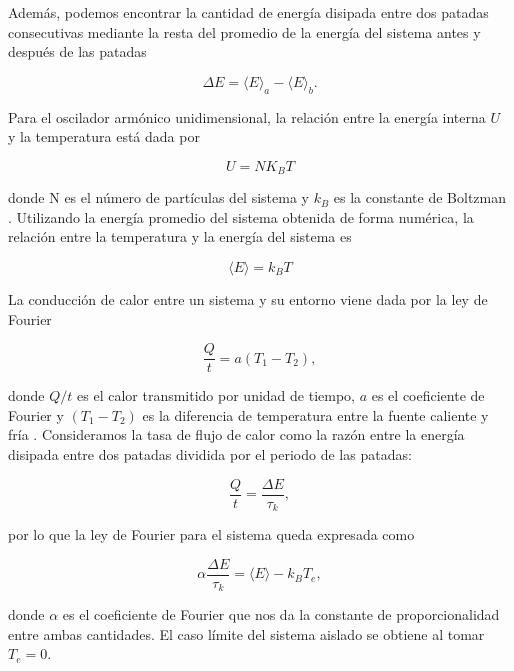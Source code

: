 \documentclass[letterpaper,12pt,oneside]{book}
\begin{document}
	Además, podemos encontrar la cantidad de energía disipada entre dos patadas consecutivas mediante la resta del promedio de la energía del sistema antes y después de las patadas
	
	\begin{equation}\label{Eq.DeltaE}
	\Delta E = \langle E \rangle_a - \langle E \rangle_b.
	\end{equation}
	
	Para el oscilador armónico unidimensional, la relación entre la energía interna $U$ y la temperatura está dada por
	
	\begin{equation} \label{Eq.EnergiaInterna}
	U = N K_B T
	\end{equation}
	
	\noindent donde N es el número de partículas del sistema y $k_B$ es la constante de Boltzman \cite{CursoFisEstadistica}. Utilizando la energía promedio del sistema obtenida de forma numérica, la relación entre la temperatura y la energía del sistema es
	
	\begin{equation}
	\langle E \rangle = k_BT
	\end{equation}
	
	La conducción de calor entre un sistema y su entorno viene dada por la ley de Fourier
	
	\begin{equation}\label{Eq.FourierGeneral}
	\frac{Q}{t} = a(T_1 - T_2),
	\end{equation}
	
	\noindent donde $Q/t$ es el calor transmitido por unidad de tiempo, $a$ es el coeficiente de Fourier y $(T_1 - T_2)$ es la diferencia de temperatura entre la fuente caliente y fría  \cite{ModernTermo}. Consideramos la tasa de flujo de calor como la razón entre la energía disipada entre dos patadas dividida por el periodo de las patadas:
	
	\begin{equation}
	\frac{Q}{t}  = \frac{\Delta E}{\tau_k},
	\end{equation}
	
	\noindent por lo que la ley de Fourier para el sistema queda expresada como
	
	
	\begin{equation}\label{Eq.Fourier}
	\alpha \frac{\Delta E}{\tau_k} = \langle E \rangle - k_BT_e,
	\end{equation}
	
	\noindent donde $\alpha$ es el coeficiente de Fourier que nos da la constante de proporcionalidad entre ambas cantidades. El caso l\'imite del sistema aislado se obtiene al tomar $T_e = 0$.
	
\end{document}
